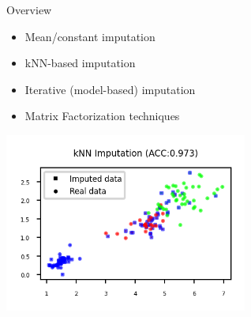 \begin{frame}{Overview}

\begin{itemize}
    \item Mean/constant imputation
    \item kNN-based imputation
    \item Iterative (model-based) imputation
    \item Matrix Factorization techniques
\end{itemize}

\vspace{1em}

\begin{center}
    \includegraphics[width=0.6\textwidth]{images/pre-processing/knn-imputation.png}
\end{center}

\end{frame}


